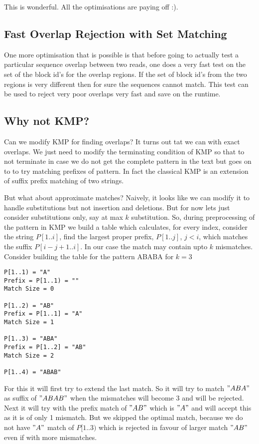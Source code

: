 \documentclass{article}
\begin{document}
          This is wonderful. All the optimisations are paying off :).
            
        \subsection{Fast Overlap Rejection with Set Matching}
            
            One more optimisation that is possible is that before going to actually test a particular sequence overlap between two reads, one does a very fast test on the set of the block id's for the overlap regions. If the set of block id's from the two regions is very different then for sure the sequences cannot match. This test can be used to reject very poor overlaps very fast and save on the runtime.
            
        \subsection{Why not KMP?}
        
            Can we modify KMP for finding overlaps? It turns out tat we can with exact overlaps. We just need to modify the terminating condition of KMP so that to not terminate in case we do not get the complete pattern in the text but goes on to to try matching prefixes of pattern. In fact the classical KMP is an extension of suffix prefix matching of two strings.

            But what about approximate matches? Naively, it looks like we can modify it to handle substitutions but not insertion and deletions. But for now lets just consider substitutions only, say at max $k$ substitution. So, during preprocessing of the pattern in KMP we build a table which calculates, for every index, consider the string $P[1..i]$, find the largest proper prefix, $P[1..j]$, $j<i$, which matches the suffix $P[i-j+1..i]$. In our case the match may contain upto $k$ mismatches. Consider building the table for the pattern ABABA for $k=3$

\begin{verbatim}
P[1..1) = "A"
Prefix = P[1..1) = ""
Match Size = 0

P[1..2) = "AB"
Prefix = P[1..1] = "A"
Match Size = 1

P[1..3) = "ABA"
Prefix = P[1..2] = "AB"
Match Size = 2

P[1..4) = "ABAB"
\end{verbatim}

            For this it will first try to extend the last match. So it will try to match $"ABA"$ as suffix of $"ABAB"$ when the mismatches will become 3 and will be rejected. Next it will try with the prefix match of $"AB"$ which is $"A"$ and will accept this as it is of only 1 mismatch. But we skipped the optimal match, because we do not have $"A"$ match of $P[1..3)$ which is rejected in favour of larger match $"AB"$ even if with more mismatches. 
\end{document}
